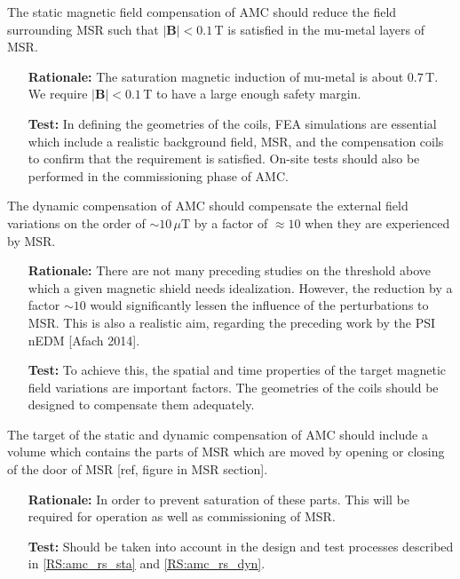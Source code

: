 \begin{RSenumerate}[resume]
\item  The static magnetic field compensation of AMC should reduce the field surrounding MSR such that $|\mathbf{B}|<0.1\,$T is satisfied in the mu-metal layers of MSR. \label{RS:amc_rs_sta}
\begin{itemize}
  \item[\textbf{Rationale:}] The saturation magnetic induction of mu-metal is about $ 0.7\,$T. We require $|\mathbf{B}|<0.1\,$T to have a large enough safety margin.
  \item[\textbf{Test:}] In defining the geometries of the coils, FEA simulations are essential which include a realistic background field, MSR, and the compensation coils to confirm that the requirement is satisfied. On-site tests should also be performed in the commissioning phase of AMC.
\end{itemize}

 \item The dynamic compensation of AMC should compensate the external field variations on the order of $\sim 10\,\mu$T by a factor of $\approx 10$ when they are experienced by MSR. \label{RS:amc_rs_dyn}
 \begin{itemize}
  \item[\textbf{Rationale:}] 
  There are not many preceding studies on the threshold above which a given magnetic shield needs idealization. However, the reduction by a factor $\sim 10$ would significantly lessen the influence of the perturbations to MSR. This is also a realistic aim, regarding the preceding work by the PSI nEDM [Afach 2014]. 
  \item[\textbf{Test:}] 
  To achieve this, the spatial and time properties of the target magnetic field variations are important factors. The geometries of the coils should be designed to compensate them adequately.
\end{itemize}

 \item The target of the static and dynamic compensation of AMC should include a volume which contains the parts of MSR which are moved by opening or closing of the door of MSR [ref, figure in MSR section]\label{RS:amc_rs_volume}.
 \begin{itemize}
  \item[\textbf{Rationale:}] In order to prevent saturation of these parts. This will be required for operation as well as commissioning of MSR. 
  \item[\textbf{Test:}] Should be taken into account in the design and test processes described in \ref{RS:amc_rs_sta} and \ref{RS:amc_rs_dyn}.
\end{itemize}
\end{RSenumerate}

